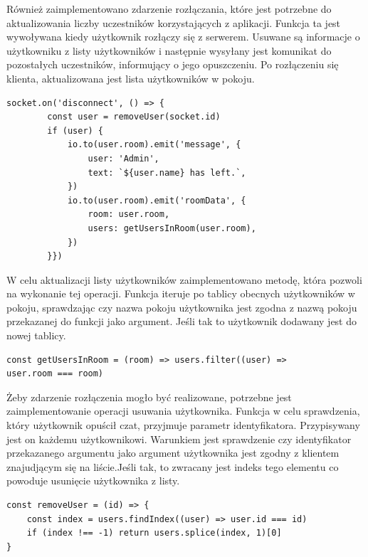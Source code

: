 Również zaimplementowano zdarzenie rozłączania, które jest potrzebne do aktualizowania liczby uczestników korzystających z aplikacji. Funkcja ta jest wywoływana kiedy użytkownik rozłączy się z serwerem. Usuwane są informacje o użytkowniku z listy użytkowników i następnie wysyłany jest komunikat do pozostałych uczestników, informujący o jego opuszczeniu. Po rozłączeniu się klienta, aktualizowana jest lista użytkowników w pokoju.
\newpage
\begin{lstlisting}[caption=Implementacja zdarzenia rozlaczania]
socket.on('disconnect', () => {
        const user = removeUser(socket.id)
        if (user) {
            io.to(user.room).emit('message', {
                user: 'Admin',
                text: `${user.name} has left.`,
            })
            io.to(user.room).emit('roomData', {
                room: user.room,
                users: getUsersInRoom(user.room),
            })
        }})
\end{lstlisting}

W celu aktualizacji listy użytkowników zaimplementowano metodę, która pozwoli na wykonanie tej operacji. Funkcja iteruje po tablicy obecnych użytkowników w pokoju, sprawdzając czy nazwa pokoju użytkownika jest zgodna z nazwą pokoju przekazanej do funkcji jako argument. Jeśli tak to użytkownik dodawany jest do nowej tablicy.
\begin{lstlisting}[caption=Implementacja funkcji aktualizujaca liste uzytkownikow]
const getUsersInRoom = (room) => users.filter((user) => 
user.room === room)
\end{lstlisting}

Żeby zdarzenie rozłączenia mogło być realizowane, potrzebne jest zaimplementowanie operacji usuwania użytkownika. Funkcja w celu sprawdzenia, który użytkownik opuścił czat, przyjmuje parametr identyfikatora. Przypisywany jest on każdemu użytkownikowi. Warunkiem jest sprawdzenie czy identyfikator przekazanego argumentu jako argument użytkownika jest zgodny z klientem znajudjącym się na liście.Jeśli tak, to zwracany jest indeks tego elementu co powoduje usunięcie użytkownika z listy. 
\begin{lstlisting}[caption=Implementacja funkcji usuwania uzytkownika]
const removeUser = (id) => {
    const index = users.findIndex((user) => user.id === id)
    if (index !== -1) return users.splice(index, 1)[0]
}
\end{lstlisting}
\newpage
